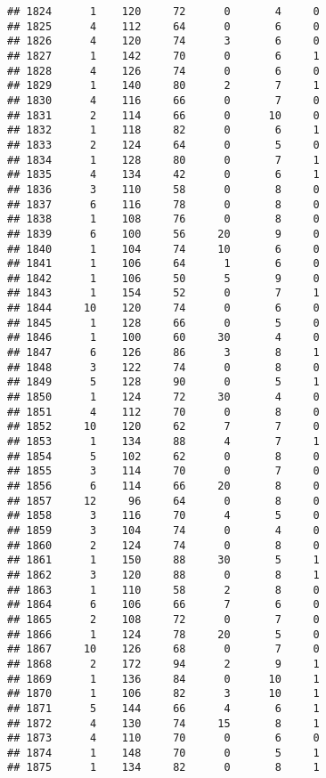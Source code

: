 \documentclass[
]{article}
\begin{document}
\begin{verbatim}
## 1824      1    120     72      0       4     0
## 1825      4    112     64      0       6     0
## 1826      4    120     74      3       6     0
## 1827      1    142     70      0       6     1
## 1828      4    126     74      0       6     0
## 1829      1    140     80      2       7     1
## 1830      4    116     66      0       7     0
## 1831      2    114     66      0      10     0
## 1832      1    118     82      0       6     1
## 1833      2    124     64      0       5     0
## 1834      1    128     80      0       7     1
## 1835      4    134     42      0       6     1
## 1836      3    110     58      0       8     0
## 1837      6    116     78      0       8     0
## 1838      1    108     76      0       8     0
## 1839      6    100     56     20       9     0
## 1840      1    104     74     10       6     0
## 1841      1    106     64      1       6     0
## 1842      1    106     50      5       9     0
## 1843      1    154     52      0       7     1
## 1844     10    120     74      0       6     0
## 1845      1    128     66      0       5     0
## 1846      1    100     60     30       4     0
## 1847      6    126     86      3       8     1
## 1848      3    122     74      0       8     0
## 1849      5    128     90      0       5     1
## 1850      1    124     72     30       4     0
## 1851      4    112     70      0       8     0
## 1852     10    120     62      7       7     0
## 1853      1    134     88      4       7     1
## 1854      5    102     62      0       8     0
## 1855      3    114     70      0       7     0
## 1856      6    114     66     20       8     0
## 1857     12     96     64      0       8     0
## 1858      3    116     70      4       5     0
## 1859      3    104     74      0       4     0
## 1860      2    124     74      0       8     0
## 1861      1    150     88     30       5     1
## 1862      3    120     88      0       8     1
## 1863      1    110     58      2       8     0
## 1864      6    106     66      7       6     0
## 1865      2    108     72      0       7     0
## 1866      1    124     78     20       5     0
## 1867     10    126     68      0       7     0
## 1868      2    172     94      2       9     1
## 1869      1    136     84      0      10     1
## 1870      1    106     82      3      10     1
## 1871      5    144     66      4       6     1
## 1872      4    130     74     15       8     1
## 1873      4    110     70      0       6     0
## 1874      1    148     70      0       5     1
## 1875      1    134     82      0       8     1

\end{verbatim}
\end{document}
